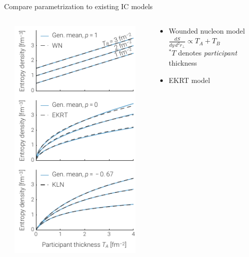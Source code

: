 \documentclass[xcolor=dvipsnames]{beamer}
\begin{document}
\begin{frame}[plain]
\end{frame}

\usebackgroundtemplate{}


\begin{frame}{Compare parametrization to existing IC models}
    \medskip
    \begin{columns}[T]
        \begin{column}{0.03\textwidth}
        \end{column}
        \begin{column}{0.36\textwidth}
            \includegraphics{cgc_compare}
        \end{column}
        \begin{column}{0.01\textwidth}
        \end{column}
        \begin{column}{0.58\textwidth}
            \begin{itemize}
                \smallskip
                \itemsep2ex \small
                \item Wounded nucleon model \\[1em]
                      $\displaystyle \frac{dS}{dy\,d^2r_\perp} 
                      \propto T_A + T_B$ \\[1em]
                      {\scriptsize $^*T$ denotes \emph{participant} thickness} 
                \item EKRT model \; {\scriptsize \color{theme} 
}
\end{itemize}
\end{column}
\end{columns}
\end{frame}
\end{document}
